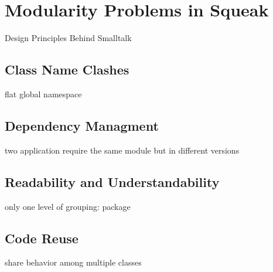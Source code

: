 \chapter{Modularity Problems in Squeak}
Design Principles Behind Smalltalk

\section{Class Name Clashes}
flat global namespace

\section{Dependency Managment}
two application require the same module but in different versions

\section{Readability and Understandability}
only one level of grouping: package

\section{Code Reuse}
share behavior among multiple classes
